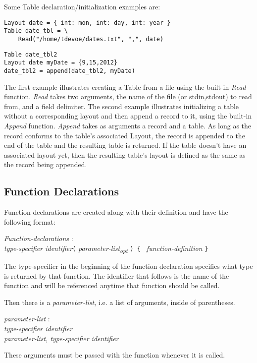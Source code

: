 \documentclass{article}
\begin{document}
Some Table declaration/initialization examples are:

\begin{lstlisting}
Layout date = { int: mon, int: day, int: year }
Table date_tbl = \
	Read("/home/tdevoe/dates.txt", ",", date)
\end{lstlisting}
\begin{lstlisting}
Table date_tbl2
Layout date myDate = {9,15,2012}
date_tbl2 = append(date_tbl2, myDate)
\end{lstlisting}

The first example illustrates creating a Table from a file using the built-in \emph{Read} function. \emph{Read} takes two arguments, the name of the file (or stdin,stdout) to read from, and a field delimiter. The second example illustrates initializing a table without a corresponding layout and then append a record to it, using the built-in \emph{Append} function. \emph{Append} takes as arguments a record and a table. As long as the record conforms to the table's associated Layout, the record is appended to the end of the table and the resulting table is returned. If the table doesn't have an associated layout yet, then the resulting table's layout is defined as the same as the record being appended.

\subsection{Function Declarations}
\label{sec:funcdec}
Function declarations are created along with their definition and have the following format:
\begin{tabbing}
	\= \emph{Function}\=\emph{-declarations} : \\
		\> \> \emph{type-specifier identifier}\texttt{(} \emph{parameter-list\textsubscript{opt}} \texttt{) 
\{ } \emph{function-definition} \texttt{\}}
\end{tabbing}

The type-specifier in the beginning of the function declaration specifies what type is returned by that function. The identifier that follows is the name of the function and will be referenced anytime that function should be called. 

Then there is a \emph{parameter-list}, i.e. a list of arguments, inside of parentheses.
\begin{tabbing}
	\= \emph{param}\=\emph{eter-list} : \\
		\> \> \emph{type-specifier identifier} \\
		\> \> \emph{parameter-list, type-specifier identifier}
\end{tabbing}
These arguments must be passed with the function whenever it is called.
\end{document}
